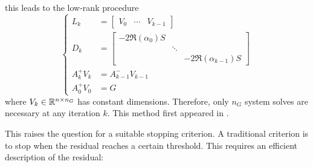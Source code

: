 this leads to the low-rank procedure
\begin{equation}
\label{eq:adi:si-lr-adi}
\left\{
\begin{aligned}
  L_k &= \begin{bmatrix}
    V_0 &
    \cdots &
    V_{k-1}
  \end{bmatrix} \\
  D_k &= \begin{bmatrix}
    -2 \Re(\alpha_0) S \\
    & \ddots \\
    && -2 \Re(\alpha_{k-1}) S
  \end{bmatrix} \\
  A_k^+ V_k &= A_{k-1}^- V_{k-1} \\
  A_0^+ V_0 &= G
\end{aligned}
\right.
\end{equation}
where $V_k \in\mathbb{R}^{n\times n_G}$ has constant dimensions.
Therefore, only $n_G$ system solves are necessary at any iteration $k$.
This method first appeared in \cite[Section~5]{Benner2009}.

This raises the question for a suitable stopping criterion.
A traditional criterion is to stop when the residual reaches a certain threshold.
This requires an efficient description of the residual:

